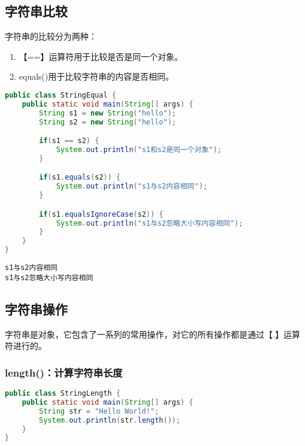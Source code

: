 \vspace{0.5cm}

\subsection{字符串比较}

字符串的比较分为两种：

\begin{enumerate}
	\item 【==】运算符用于比较是否是同一个对象。
	\item equals()用于比较字符串的内容是否相同。
\end{enumerate}


\begin{lstlisting}[language=Java]
public class StringEqual {
	public static void main(String[] args) {
		String s1 = new String("hello");
		String s2 = new String("hello");

		if(s1 == s2) {
			System.out.println("s1和s2是同一个对象");
		}

		if(s1.equals(s2)) {
			System.out.println("s1与s2内容相同");
		}

		if(s1.equalsIgnoreCase(s2)) {
			System.out.println("s1与s2忽略大小写内容相同");
		}
	}
}
\end{lstlisting}

\begin{tcolorbox}
	\begin{verbatim}
s1与s2内容相同
s1与s2忽略大小写内容相同
	\end{verbatim}
\end{tcolorbox}

\subsection{字符串操作}

字符串是对象，它包含了一系列的常用操作，对它的所有操作都是通过【.】运算符进行的。

\subsubsection{length()：计算字符串长度}

\vspace{0.5cm}


\begin{lstlisting}[language=Java]
public class StringLength {
	public static void main(String[] args) {
		String str = "Hello World!";
		System.out.println(str.length());
	}
}
\end{lstlisting}

